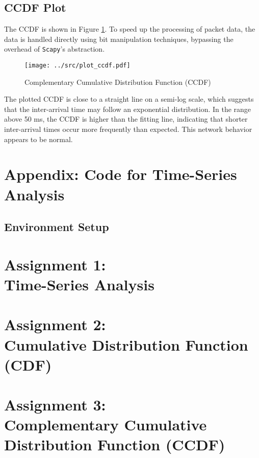\documentclass{article}
\begin{document}
\subsection{CCDF Plot}
The CCDF is shown in Figure \ref{fig:ccdf}.
To speed up the processing of packet data, the data is handled directly using bit manipulation techniques, bypassing the overhead of \texttt{Scapy}’s abstraction.
\begin{figure}[tb]
	\centering
	\texttt{[image: ../src/plot\_ccdf.pdf]}
	\caption{Complementary Cumulative Distribution Function (CCDF)}
	\label{fig:ccdf}
\end{figure}

The plotted CCDF is close to a straight line on a semi-log scale,
which suggests that the inter-arrival time may follow an exponential distribution.
In the range above 50 ms, the CCDF is higher than the fitting line, indicating that shorter inter-arrival times occur more frequently than expected.
This network behavior appears to be normal.
\clearpage
\appendix
\section{Appendix: Code for Time-Series Analysis}
\subsection{Environment Setup}




\section{Assignment 1:\\ Time-Series Analysis}

\section{Assignment 2:\\ Cumulative Distribution Function (CDF)}

\section{Assignment 3:\\ Complementary Cumulative Distribution Function (CCDF)}

\end{document}
